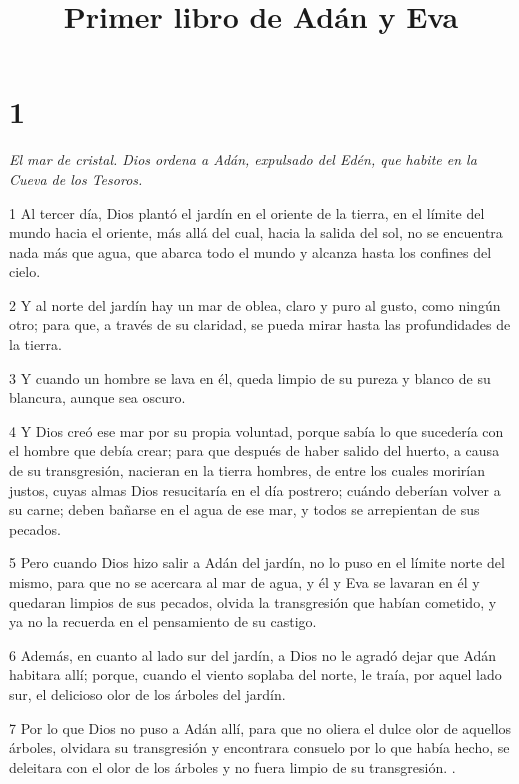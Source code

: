 

\title{Primer libro de Adán y Eva}

\chapter{1}

\par \textit{El mar de cristal. Dios ordena a Adán, expulsado del Edén, que habite en la Cueva de los Tesoros.}

\par 1 Al tercer día, Dios plantó el jardín en el oriente de la tierra, en el límite del mundo hacia el oriente, más allá del cual, hacia la salida del sol, no se encuentra nada más que agua, que abarca todo el mundo y alcanza hasta los confines del cielo.

\par 2 Y al norte del jardín hay un mar de oblea, claro y puro al gusto, como ningún otro; para que, a través de su claridad, se pueda mirar hasta las profundidades de la tierra.

\par 3 Y cuando un hombre se lava en él, queda limpio de su pureza y blanco de su blancura, aunque sea oscuro.

\par 4 Y Dios creó ese mar por su propia voluntad, porque sabía lo que sucedería con el hombre que debía crear; para que después de haber salido del huerto, a causa de su transgresión, nacieran en la tierra hombres, de entre los cuales morirían justos, cuyas almas Dios resucitaría en el día postrero; cuándo deberían volver a su carne; deben bañarse en el agua de ese mar, y todos se arrepientan de sus pecados.

\par 5 Pero cuando Dios hizo salir a Adán del jardín, no lo puso en el límite norte del mismo, para que no se acercara al mar de agua, y él y Eva se lavaran en él y quedaran limpios de sus pecados, olvida la transgresión que habían cometido, y ya no la recuerda en el pensamiento de su castigo.

\par 6 Además, en cuanto al lado sur del jardín, a Dios no le agradó dejar que Adán habitara allí; porque, cuando el viento soplaba del norte, le traía, por aquel lado sur, el delicioso olor de los árboles del jardín.

\par 7 Por lo que Dios no puso a Adán allí, para que no oliera el dulce olor de aquellos árboles, olvidara su transgresión y encontrara consuelo por lo que había hecho, se deleitara con el olor de los árboles y no fuera limpio de su transgresión. .

